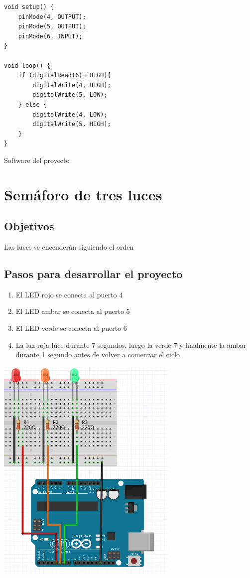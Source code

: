 \documentclass[11pt,spanish,a4paper]{article}
\begin{document}
\begin{listing}[H]
\begin{verbatim}
void setup() {
    pinMode(4, OUTPUT);
    pinMode(5, OUTPUT);
    pinMode(6, INPUT);
}

void loop() {
    if (digitalRead(6)==HIGH){
        digitalWrite(4, HIGH);
        digitalWrite(5, LOW);
    } else {
        digitalWrite(4, LOW);
        digitalWrite(5, HIGH);
    }
}
\end{verbatim}
\caption{Software del proyecto \thesection}
\end{listing}


\newpage
\section{Semáforo de tres luces}

\subsection{Objetivos} Las luces se encenderán siguiendo el orden

\subsection{Pasos para desarrollar el proyecto}
\begin{enumerate}
	\item El LED rojo se conecta al puerto 4
	\item El LED ambar se conecta al puerto 5
	\item El LED verde se conecta al puerto 6
	\item La luz roja luce durante 7 segundos, luego la verde 7 y finalmente la ambar durante 1
		segundo antes de volver a comenzar el ciclo
\end{enumerate}

\begin{center}
\includegraphics[height=11cm]{img/03.jpg}
\end{center}
\end{document}
